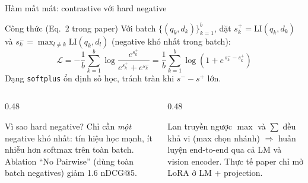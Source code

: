 \documentclass[aspectratio=169,10pt]{beamer}
\newcommand{\code}[1]{\texttt{\footnotesize #1}}
\begin{document}
\begin{frame}{Hàm mất mát: contrastive với hard negative}
  \begin{block}{\small Công thức (Eq.~2 trong paper)}
    \footnotesize
    Với batch $\{(q_k,d_k)\}_{k=1}^{b}$, đặt $s_k^{+}=\mathrm{LI}(q_k,d_k)$ và
    $s_k^{-}=\max_{l\neq k}\mathrm{LI}(q_k,d_l)$ (negative khó nhất trong batch):
    \[
      \mathcal{L}
      =-\frac{1}{b}\sum_{k=1}^{b}\log\frac{e^{s_k^{+}}}{e^{s_k^{+}}+e^{s_k^{-}}}
      =\frac{1}{b}\sum_{k=1}^{b}\log\!\left(1+e^{\,s_k^{-}-s_k^{+}}\right)
    \]
    Dạng \code{softplus} ổn định số học, tránh tràn khi $s^- - s^+$ lớn.
  \end{block}

  \vspace{2mm}
  \begin{columns}[T]
    \begin{column}{0.48\textwidth}
      \begin{block}{\small Vì sao hard negative?}
        \footnotesize
        Chỉ cần \emph{một} negative khó nhất: tín hiệu học mạnh, ít nhiễu hơn softmax trên toàn batch.
        Ablation ``No Pairwise'' (dùng toàn batch negatives) giảm 1.6 nDCG@5.
      \end{block}
    \end{column}
    \begin{column}{0.48\textwidth}
      \begin{block}{\small Lan truyền ngược}
        \footnotesize
        $\max$ và $\sum$ đều khả vi (max chọn nhánh) $\Rightarrow$ huấn luyện end-to-end qua cả LM và vision encoder.
        Thực tế paper chỉ mở LoRA ở LM + projection.
      \end{block}
    \end{column}
  \end{columns}
\end{frame}
\end{document}
